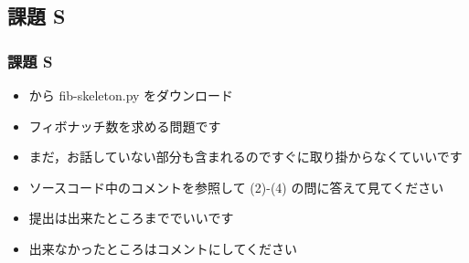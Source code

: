 %
%
\subsection{課題 S}
\begin{frame}[containsverbatim, shrink, label=quizS]
\frametitle{課題 S}
  \begin{itemize}
\item \href{https://sites.google.com/a/presystems.xyz/sample/home/elementary-computer-science}{} から fib-skeleton.py をダウンロード
\item フィボナッチ数を求める問題です
\item まだ，お話していない部分も含まれるのですぐに取り掛からなくていいです
\item ソースコード中のコメントを参照して (2)-(4) の問に答えて見てください
\item 提出は出来たところまででいいです
\item 出来なかったところはコメントにしてください
  \end{itemize}
\end{frame}
